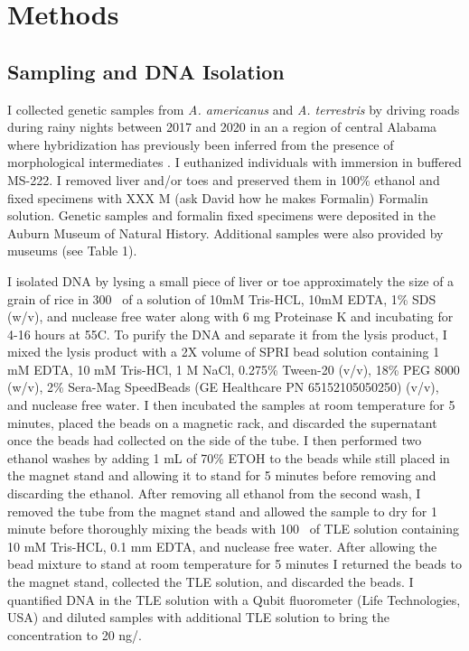 \section{Methods}
\subsection{Sampling and DNA Isolation}
I collected genetic samples from \textit{A. americanus} and \textit{A. terrestris}
by driving roads during rainy nights between 2017 and 2020
in an a region of central Alabama where hybridization has previously been
inferred from the presence of morphological intermediates \parencite{weatherby1982}. 
I euthanized individuals with immersion in buffered MS-222.
I removed liver and/or toes and preserved them in 100\% ethanol and fixed 
specimens with XXX M (ask David how he makes Formalin) Formalin solution.
Genetic samples and formalin fixed specimens were deposited in the Auburn Museum of Natural History.
Additional samples were also provided by museums (see Table 1).

I isolated DNA by lysing a small piece of liver or toe approximately 
the size of a grain of rice in 300 \uL\ of a solution of 10mM Tris-HCL, 10mM EDTA, 
1\% SDS (w/v), and nuclease free water along with 6 mg Proteinase K and 
incubating for 4-16 hours at 55\degree C.  
To purify the DNA and separate it from the lysis product, I mixed the lysis 
product with a 2X volume of SPRI bead solution containing 1 mM EDTA,  
10 mM Tris-HCl, 1 M NaCl, 0.275\% Tween-20 (v/v), 18\% PEG 8000 (w/v), 
2\% Sera-Mag SpeedBeads (GE Healthcare PN 65152105050250) (v/v), and nuclease free water.
I then incubated the samples at room temperature for 5 minutes, placed the 
beads on a magnetic rack, and discarded the supernatant once the beads had collected
on the side of the tube.  
I then performed two ethanol washes by adding 1 mL of 70\% ETOH to the beads
while still placed in the magnet stand and allowing it to stand for 5 minutes
before removing and discarding the ethanol. 
After removing all ethanol from the second wash, I removed the tube from the magnet 
stand and allowed the sample to dry for 1 minute before thoroughly mixing the beads with 100 \uL\ of 
TLE solution containing 10 mM Tris-HCL, 0.1 mm EDTA, and nuclease free water.
After allowing the bead mixture to stand at room temperature for 5 minutes I returned
the beads to the magnet stand, collected the TLE solution, and discarded the beads. 
I quantified DNA in the TLE solution with a Qubit
fluorometer (Life Technologies, USA) and diluted samples with additional TLE solution to 
bring the concentration to 20 ng/\uL.

